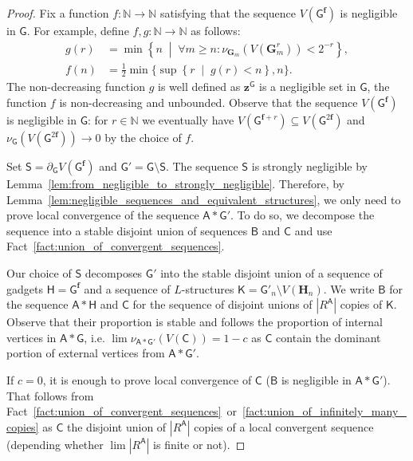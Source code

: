 \documentclass[11pt]{article}
\theoremstyle{plain}
\theoremstyle{definition}
\theoremstyle{remark}
\newcommand{\N}{\mathbb{N}}
\newcommand{\str}[1]{\mathbf{#1}}
\newcommand{\strseq}[1]{{\boldsymbol{\mathsf{#1}}}}
\newcommand{\seq}[1]{{\mathsf{#1}}}
\newcommand{\tpl}[1]{{\bm{#1}}}
\begin{document}
\begin{proof}
    Fix a function $f:\N \to \N$ satisfying that the sequence $V(\strseq{G}^{\bm{f}})$ is negligible in $\strseq{G}$.
    For example, define $f,g: \N \to \N$ as follows:
    \begin{align*}
        g(r) &= \min 
        \left\lbrace 
            n \;\middle|\; \forall m \geq n : \nu_{\str{G}_m}(V(\str{G}_m^r)) < 2^{-r}
        \right\rbrace
        , \\
        f(n) &= \frac{1}{2} \min\{ 
        \sup 
        \left\lbrace 
            r \;\middle|\; g(r) < n
        \right\rbrace
        ,
        n
        \}
        .
    \end{align*}
    The non-decreasing function $g$ is well defined as $\tpl{z}^\strseq{G}$ is a negligible set in $\strseq{G}$, the function $f$ is non-decreasing and unbounded.
    Observe that the sequence $V(\strseq{G}^{\bm{f}})$ is negligible in $\strseq{G}$: for $r \in \N$ we eventually have $V(\strseq{G}^{\bm{f}+r}) \subseteq V(\strseq{G}^{2\bm{f}})$ and $\nu_\strseq{G}(V(\strseq{G}^{2\bm{f}})) \to 0$ by the choice of $f$.
    
    Set $\seq{S} = \partial_\strseq{G} V(\strseq{G}^{\bm{f}})$ and $\strseq{G}' = \strseq{G} \setminus \seq{S}$.
    The sequence $\seq{S}$ is strongly negligible by Lemma~\ref{lem:from_negligible_to_strongly_negligible}.
    Therefore, by Lemma~\ref{lem:negligible_sequences_and_equivalent_structures}, we only need to prove local convergence of the sequence $\strseq{A}*\strseq{G}'$.
    To do so, we decompose the sequence into a stable disjoint union of sequences $\strseq{B}$ and $\strseq{C}$ and use Fact~\ref{fact:union_of_convergent_sequences}.
    
    Our choice of $\seq{S}$ decomposes $\strseq{G}'$ into the stable disjoint union of a sequence of gadgets $\strseq{H} = \strseq{G}^{\bm{f}}$ and a sequence of $L$-structures $\strseq{K} = \strseq{G}'_n \setminus V(\str{H}_n)$.
    We write $\strseq{B}$ for the sequence $\strseq{A}*\strseq{H}$ and $\strseq{C}$ for the sequence of disjoint unions of $|R^\strseq{A}|$ copies of $\strseq{K}$.
    Observe that their proportion is stable and follows the proportion of internal vertices in $\strseq{A}*\strseq{G}$, i.e. $\lim \nu_{\strseq{A}*\strseq{G}'}(V(\strseq{C})) = 1 - c$ as $\strseq{C}$ contain the dominant portion of external vertices from $\strseq{A}*\strseq{G}'$.
    
    If $c = 0$, it is enough to prove local convergence of $\strseq{C}$ ($\strseq{B}$ is negligible in $\strseq{A}*\strseq{G}'$).
    That follows from Fact~\ref{fact:union_of_convergent_sequences}~or~\ref{fact:union_of_infinitely_many_copies} as $\strseq{C}$ the disjoint union of $|R^\strseq{A}|$ copies of a local convergent sequence (depending whether $\lim |R^\strseq{A}|$ is finite or not).
    

\end{proof}
\end{document}
